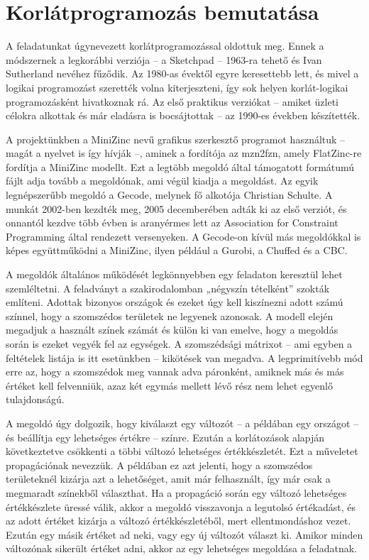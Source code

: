 \documentclass[12pt,a4paper,twoside, openright]{report}
\begin{document}
\section{Korlátprogramozás bemutatása} 

    A feladatunkat úgynevezett korlátprogramozással oldottuk meg.
    Ennek a módszernek a legkorábbi verziója – a Sketchpad – 1963-ra tehető és Ivan Sutherland nevéhez fűződik\cite{sketchpad}.
    Az 1980-as évektől egyre keresettebb lett, és mivel a logikai programozást szerették volna kiterjeszteni, így sok helyen korlát-logikai programozásként hivatkoznak rá.
    Az első praktikus verziókat – amiket üzleti célokra alkottak és már eladásra is bocsájtottak – az 1990-es években készítették.

    A projektünkben a MiniZinc nevű grafikus szerkesztő programot használtuk – magát a nyelvet is így hívják –, aminek a fordítója az mzn2fzn, amely FlatZinc-re fordítja a MiniZinc modellt.
    Ezt a legtöbb megoldó által támogatott formátumú fájlt adja tovább a megoldónak, ami végül kiadja a megoldást.
    Az egyik legnépszerűbb megoldó a Gecode, melynek fő alkotója Christian Schulte\cite{gecode}.
    A munkát 2002-ben kezdték meg, 2005 decemberében adták ki az első verziót, és onnantól kezdve több évben is aranyérmes lett az Association for Constraint Programming által rendezett versenyeken.
    A Gecode-on kívül más megoldókkal is képes együttműködni a MiniZinc, ilyen például a Gurobi, a Chuffed és a CBC.
    
    A megoldók általános működését legkönnyebben egy feladaton keresztül lehet szemléltetni.
    A feladványt a szakirodalomban „négyszín tételként” szokták említeni.
    Adottak bizonyos országok és ezeket úgy kell kiszínezni adott számú színnel, hogy a szomszédos területek ne legyenek azonosak.
    A modell elején megadjuk a használt színek számát és külön ki van emelve, hogy a megoldás során is ezeket vegyék fel az egységek.
    A szomszédsági mátrixot – ami egyben a feltételek listája is itt esetünkben – kikötések van megadva.
    A legprimitívebb mód erre az, hogy a szomszédok meg vannak adva páronként, amiknek más és más értéket kell felvenniük, azaz két egymás mellett lévő rész nem lehet egyenlő tulajdonságú.


    A megoldó úgy dolgozik, hogy kiválaszt egy változót – a példában egy országot – és beállítja egy lehetséges értékre – színre.
    Ezután a korlátozások alapján következtetve csökkenti a többi változó lehetséges értékkészletét.
    Ezt a műveletet propagációnak nevezzük.
    A példában ez azt jelenti, hogy a szomszédos területeknél kizárja azt a lehetőséget, amit már felhasznált, így már csak a megmaradt színekből választhat.
    Ha a propagáció során egy változó lehetséges értékkészlete üressé válik, akkor a megoldó visszavonja a legutolsó értékadást, és az adott értéket kizárja a változó értékkészletéből, mert ellentmondáshoz vezet.
    Ezután egy másik értéket ad neki, vagy egy új változót választ ki.
    Amikor minden változónak sikerült értéket adni, akkor az egy lehetséges megoldása a feladatnak.
    
\end{document}

